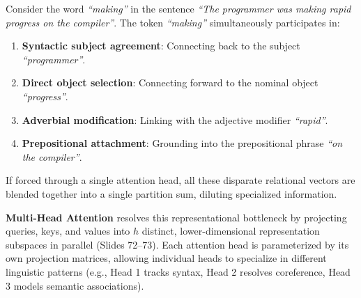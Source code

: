 \documentclass[../../../main.tex]{subfiles}
\begin{document}
Consider the word \emph{``making''} in the sentence \emph{``The programmer was making rapid progress on the compiler''}. The token \emph{``making''} simultaneously participates in:
\begin{enumerate}
    \item \textbf{Syntactic subject agreement}: Connecting back to the subject \emph{``programmer''}.
    \item \textbf{Direct object selection}: Connecting forward to the nominal object \emph{``progress''}.
    \item \textbf{Adverbial modification}: Linking with the adjective modifier \emph{``rapid''}.
    \item \textbf{Prepositional attachment}: Grounding into the prepositional phrase \emph{``on the compiler''}.
\end{enumerate}
If forced through a single attention head, all these disparate relational vectors are blended together into a single partition sum, diluting specialized information.

\textbf{Multi-Head Attention} resolves this representational bottleneck by projecting queries, keys, and values into $h$ distinct, lower-dimensional representation subspaces in parallel (Slides 72--73). Each attention head is parameterized by its own projection matrices, allowing individual heads to specialize in different linguistic patterns (e.g., Head 1 tracks syntax, Head 2 resolves coreference, Head 3 models semantic associations).
\end{document}
